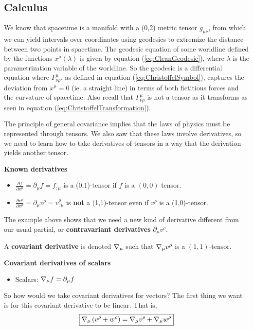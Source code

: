 \documentclass{article}
\begin{document}
 		\subsection{Calculus}
 			We know that spacetime is a manifold with a (0,2) metric tensor $g_{\mu\nu}$, from which we can yield intervals over coordinates using geodesics to extremize the distance between two points in spacetime. The geodesic equation of some worldline defined by the functions $x^\mu (\lambda)$ is given by equation (\ref{eq:CleanGeodesic}), where $\lambda$ is the parametrization variable of the worldline. So the geodesic is a differential equation where $\Gamma_{\nu\rho}^\mu$, as defined in equation (\ref{eq:ChristoffelSymbol}), captures the deviation from $\ddot{x}^\mu = 0$ (ie. a straight line) in terms of both fictitious forces and the curvature of spacetime. Also recall that $\Gamma_{\nu\rho}^\mu$ is not a tensor as it transforms as seen in equation (\ref{eq:ChristoffelTransformation}).
 			
 			The principle of general covariance implies that the laws of physics must be represented through tensors. We also saw that these laws involve derivatives, so we need to learn how to take derivatives of tensors in a way that the derivation yields another tensor. 
 		
 		\pagebreak
 			\begin{exmp}
 				\textbf{Known derivatives}\\
 				\begin{itemize}
 					\item$\frac{\partial f}{\partial x^\mu} = \partial_\mu f = f_{;\mu} $ is a (0,1)-tensor if $f$ is a $(0,0)$ tensor.
 					\item $\frac{\partial v^\rho}{\partial x^\mu} = \partial_\mu v^\rho = v^\rho_{;\mu}$ is \textbf{not} a (1,1)-tensor even if $v^\rho$ is a (1,0)-tensor.
 				\end{itemize}
 			\end{exmp}
 			The example above shows that we need a new kind of derivative different from our usual partial, or \textbf{contravariant derivatives} $\partial_\mu v^\rho$.
 			\begin{defn}
 				A \textbf{covariant derivative} is denoted $\nabla_\mu$ such that
 				$\nabla_\mu v^\rho$ is a $(1,1)$-tensor. 
 			\end{defn}
 			\begin{exmp}
 				\textbf{Covariant derivatives of scalars}
 				\begin{itemize}
 					\item Scalars: $\nabla_\mu f = \partial_\mu f$
 				\end{itemize}
 			\end{exmp}
 			So how would we take covariant derivatives for vectors? The first thing we want is for this covariant derivative to be linear. That is,
 			\begin{equation}
 				\label{eq:LinearLaplace}
 				\boxed{\nabla_\mu \left(v^\rho + w^\rho \right) = \nabla_\mu v^\rho + \nabla_\mu w^\rho}
 			\end{equation}
\end{document}

